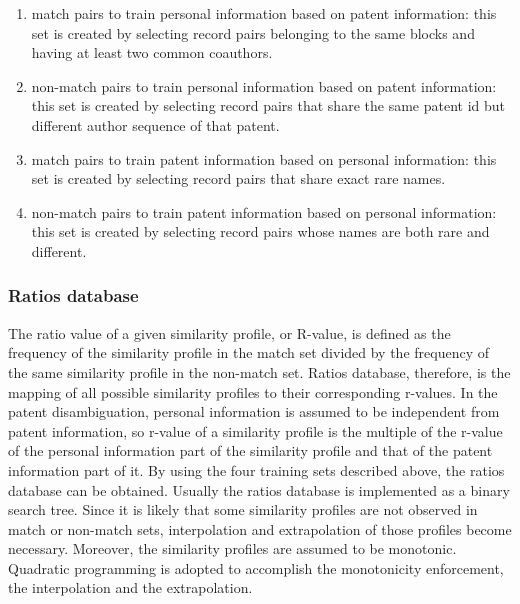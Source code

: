 \documentclass{article}
\begin{document}
\begin{enumerate}

\item match pairs to train personal information based
on patent information: this set is created by selecting
record pairs belonging to the same blocks and having at
least two common coauthors.

\item non-match pairs to train personal information based
on patent information: this set is created by
selecting record pairs that share the same patent id but
different author sequence of that patent.

\item match pairs to train patent information based on
personal information: this set is created by
selecting record pairs that share exact rare names.

\item non-match pairs to train patent information based on
personal information: this set is created by
selecting record pairs whose names are both rare and different.

\end{enumerate}


\subsubsection{Ratios database}


The ratio value of a given similarity profile, or R-value,
is defined as the frequency of the similarity profile in the
match set divided by the frequency of the same similarity
profile in the non-match set. Ratios database, therefore,
is the mapping of all possible similarity profiles to
their corresponding r-values. In the patent disambiguation,
personal information is assumed to be independent from patent
information, so r-value of a similarity profile is the
multiple of the r-value of the personal information
part of the similarity profile and that of the patent
information part of it. By using the four training sets
described above, the ratios database can be obtained. Usually
the ratios database is implemented as a binary search tree.
Since it is likely that some similarity profiles are not
observed in match or non-match sets, interpolation and
extrapolation of those profiles become necessary. Moreover, the
similarity profiles are assumed to be monotonic. Quadratic
programming is adopted to accomplish the monotonicity
enforcement, the interpolation and the extrapolation.
\end{document}
